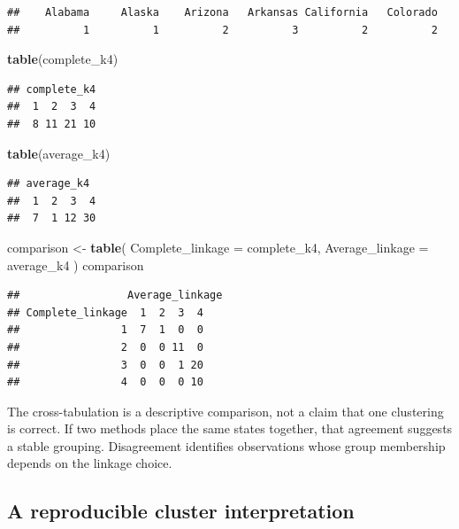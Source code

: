 \documentclass[
  11pt,
]{article}
\newenvironment{Shaded}{\begin{snugshade}}{\end{snugshade}}
\newcommand{\AttributeTok}[1]{\textcolor[rgb]{0.13,0.29,0.53}{#1}}
\newcommand{\FunctionTok}[1]{\textcolor[rgb]{0.13,0.29,0.53}{\textbf{#1}}}
\newcommand{\NormalTok}[1]{#1}
\newcommand{\OtherTok}[1]{\textcolor[rgb]{0.56,0.35,0.01}{#1}}
\begin{document}
\begin{verbatim}
##    Alabama     Alaska    Arizona   Arkansas California   Colorado 
##          1          1          2          3          2          2
\end{verbatim}

\begin{Shaded}
\begin{Highlighting}[]
\FunctionTok{table}\NormalTok{(complete\_k4)}
\end{Highlighting}
\end{Shaded}

\begin{verbatim}
## complete_k4
##  1  2  3  4 
##  8 11 21 10
\end{verbatim}

\begin{Shaded}
\begin{Highlighting}[]
\FunctionTok{table}\NormalTok{(average\_k4)}
\end{Highlighting}
\end{Shaded}

\begin{verbatim}
## average_k4
##  1  2  3  4 
##  7  1 12 30
\end{verbatim}

\begin{Shaded}
\begin{Highlighting}[]
\NormalTok{comparison }\OtherTok{\textless{}{-}} \FunctionTok{table}\NormalTok{(}
  \AttributeTok{Complete\_linkage =}\NormalTok{ complete\_k4,}
  \AttributeTok{Average\_linkage =}\NormalTok{ average\_k4}
\NormalTok{)}
\NormalTok{comparison}
\end{Highlighting}
\end{Shaded}

\begin{verbatim}
##                 Average_linkage
## Complete_linkage  1  2  3  4
##                1  7  1  0  0
##                2  0  0 11  0
##                3  0  0  1 20
##                4  0  0  0 10
\end{verbatim}

The cross-tabulation is a descriptive comparison, not a claim that one
clustering is correct. If two methods place the same states together,
that agreement suggests a stable grouping. Disagreement identifies
observations whose group membership depends on the linkage choice.

\subsection{A reproducible cluster
interpretation}\label{a-reproducible-cluster-interpretation}
\end{document}
